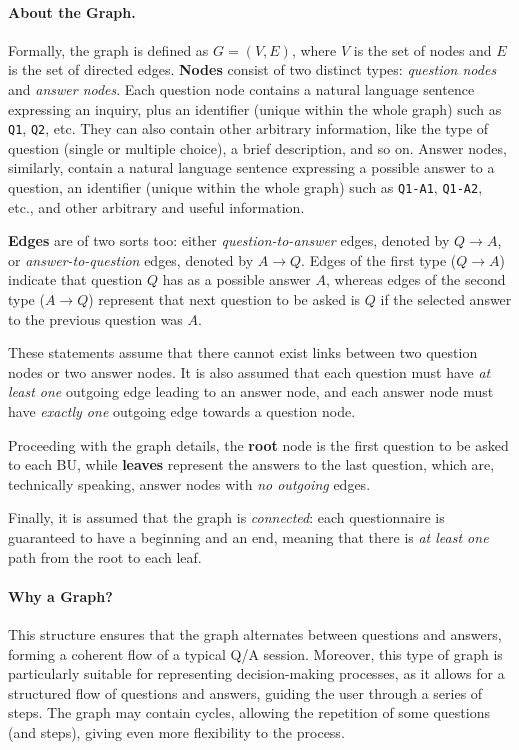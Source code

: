 \documentclass[12pt,a4paper,openright,twoside]{book}
\begin{document}
\paragraph{About the Graph.}
Formally, the graph is defined as $G = (V, E)$, where $V$ is the set of nodes and $E$ is the set of directed edges.
%
\textbf{Nodes} consist of two distinct types: \textit{question nodes} and \textit{answer nodes}.
%
Each question node contains a natural language sentence expressing an inquiry, plus an identifier (unique within the whole graph) such as \texttt{Q1}, \texttt{Q2}, etc.
%
They can also contain other arbitrary information, like the type of question (single or multiple choice), a brief description, and so on.
%
Answer nodes, similarly, contain a natural language sentence expressing a possible answer to a question, an identifier (unique within the whole graph) such as \texttt{Q1-A1}, \texttt{Q1-A2}, etc., and other arbitrary and useful information.

\textbf{Edges} are of two sorts too: either \textit{question-to-answer} edges, denoted by $Q \to A$, or \textit{answer-to-question} edges, denoted by $A \to Q$.
%
Edges of the first type ($Q \to A$) indicate that question $Q$ has as a possible answer $A$, whereas edges of the second type ($A \to Q$) represent that next question to be asked is $Q$ if the selected answer to the previous question was $A$.

These statements assume that there cannot exist links between two question nodes or two answer nodes.
%
It is also assumed that each question must have \textit{at least one} outgoing edge leading to an answer node, and each answer node must have \textit{exactly one} outgoing edge towards a question node.

Proceeding with the graph details, the \textbf{root} node is the first question to be asked to each \ac{BU}, while \textbf{leaves} represent the answers to the last question, which are, technically speaking, answer nodes with \textit{no outgoing} edges.

Finally, it is assumed that the graph is \textit{connected}: each questionnaire is guaranteed to have a beginning and an end, meaning that there is \textit{at least one} path from the root to each leaf.


\paragraph{Why a Graph?}
This structure ensures that the graph alternates between questions and answers, forming a coherent flow of a typical \ac{Q/A} session.
%
Moreover, this type of graph is particularly suitable for representing decision-making processes, as it allows for a structured flow of questions and answers, guiding the user through a series of steps.
%
The graph may contain cycles, allowing the repetition of some questions (and steps), giving even more flexibility to the process.
\end{document}
